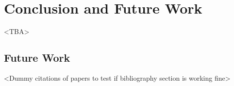 \chapter{Conclusion and Future Work}\label{chapter:conclusion and future}
<TBA>
\section{Future Work}
<Dummy citations of papers to test if bibliography section is working fine>
\cite{felix}
\cite{laxmikant}
\cite{nikolas}
\cite{rudolph}
\cite{isaias}
\cite{andreas}
\cite{georgiou}
\cite{travis}
\cite{gladys}
\cite{klein}
\cite{pavan}
\cite{jette}
\cite{abhishek}
\cite{david}
\cite{joseph}
\cite{hungershofer}
\cite{yangjie}
\cite{zhou}
\cite{lucero}
\cite{desai}
\cite{yang}
\cite{daniel}
\cite{dror}
\cite{ahuva}
\cite{dinesh}
\cite{slurm}
\cite{tsafrir}
\cite{streit}
\cite{achim}
\cite{achim1}
\cite{streit1}
\cite{achim2}
\cite{striet2}
\cite{deshmeh}
\cite{tiachao}
\cite{oliver}
\cite{alain}
\cite{viktor}
\cite{rizos}
\cite{viktor1}
\cite{javier}
\cite{kwang}
\cite{kurowski}
\cite{ariel}
\cite{roland}
\cite{cirne}
\cite{desai}
\cite{michal}
\cite{sudha}
\cite{srividya}
\cite{song}
\cite{sabin}
\cite{dalibor}
\cite{osman}
\cite{rajesh}
\cite{calvin}
\cite{sudarshan}
\cite{ribbens}
\cite{vadhiyar}
\cite{gonzalo}
\cite{martin}
\cite{gonzalo1}
\cite{maria}
\cite{srinidhi}
\cite{jamjoom}
\cite{zhiling}
\cite{siham}
\cite{deshmeh2010adept}
\cite{wcirne}
\cite{wcirne1}
\cite{daniel1}
\cite{da2015exascale}
\cite{dongxu}
\cite{buisson}
\cite{striet2}
\cite{schulz}
\cite{wong}
\cite{teich}

